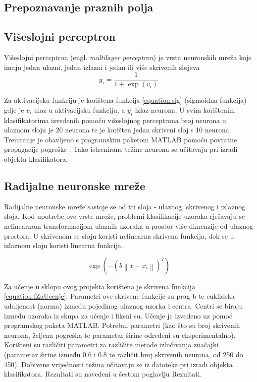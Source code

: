 \documentclass[a4paper,twocolumn,dvipdfm]{article}
\begin{document}
\subsection{Prepoznavanje praznih polja}

\subsection{Višeslojni perceptron}
Višeslojni perceptron \cite{rosenblatt1958perceptron} (engl. \emph{multilayer
perceptron}) je vrsta neuronskih mreža koje imaju jedan ulazni, jedan izlazni i
jedan ili više skrivenih slojeva
\begin{equation}
y_i = \frac{1}{1 + \exp(v_i)}
\label{equation:sig}
\end{equation}

Za aktivacijsku funkciju je korištena funkcija \ref{equation:sig} (sigmoidna
funkcija) gdje je $v_i$ ulaz u aktivacijsku funkciju, a $y_i$ izlaz neurona. U
svim korištenim klasifikatorima izvedenih pomoću višeslojnog perceptrona broj
neurona u ulaznom sloju je 20 neurona te je korišten jedan skriveni sloj s 10
neurona. Treniranje je obavljeno s programskim paketom MATLAB pomoću povratne
propagacije pogreške \cite{rumelhart1986learning}. Tako istrenirane težine
neurona se učitavaju pri izradi objekta klasifikatora.

\subsection{Radijalne neuronske mreže}
Radijalne neuronske mreže sastoje se od tri sloja - ulaznog, skrivenog i
izlaznog sloja. Kod upotrebe ove vrste mreže, problemi klasifikacije uzoraka rješavaju se nelinearnom transformacijom ulaznih uzoraka u prostor više dimenzije od ulaznog prostora. U skrivenom se sloju koristi nelinearna skrivena
funkcija, dok se u izlaznom sloju koristi linearna funkcija.

\begin{equation}
\exp(-\left (b \left \| x - x_{i} \right \|  \right )^{2})
\label{equation:fZaUcenje}
\end{equation}

Za učenje u sklopu ovog projekta korištena je skrivena funkcija \ref{equation:fZaUcenje}. Parametri ove skrivene funkcije su prag b te euklidska udaljenost (norma) između pojedinog ulaznog uzorka i centra. Centri se biraju između uzoraka iz skupa za učenje i fiksni su. Učenje je izvedeno uz pomoć programskog paketa MATLAB. Potrebni parametri (kao što su broj skrivenih neurona, željena pogreška te parametar širine određeni su eksperimentalno). Korišteni su različiti parametri za  različite metode izlučivanja značajki (parametar širine između 0.6 i 0.8 te različit broj skrivenih neurona, od 250 do 450).
Dobivene vrijednosti težina učitavaju se iz datoteke pri izradi objekta klasifikatora. Rezultati su navedeni u šestom poglavlju Rezultati.  
\end{document}
